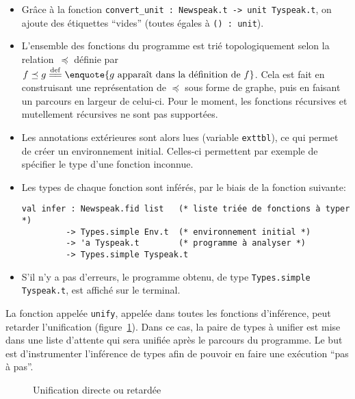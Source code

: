\begin{itemize}

\item Grâce à la fonction \verb!convert_unit : Newspeak.t -> unit Tyspeak.t!, on
ajoute des étiquettes \enquote{vides} (toutes égales à \verb!() : unit!).

\item L'ensemble des fonctions du programme est trié topologiquement selon la
    relation~$\preceq$ définie par $f \preceq g \eqdef \enquote{g \textrm{
    apparaît dans la définition de } f}$. Cela est fait en construisant une
    représentation de $\preceq$ sous forme de graphe, puis en faisant un
    parcours en largeur de celui-ci. Pour le moment, les fonctions récursives et
    mutellement récursives ne sont pas supportées.

\item Les annotations extérieures sont alors lues (variable \texttt{exttbl}), ce
  qui permet de créer un environnement initial. Celles-ci permettent par exemple
  de spécifier le type d'une fonction inconnue.

\item Les types de chaque fonction sont inférés, par le biais de la fonction
  suivante:

\begin{Verbatim}
val infer : Newspeak.fid list   (* liste triée de fonctions à typer *)
         -> Types.simple Env.t  (* environnement initial *)
         -> 'a Tyspeak.t        (* programme à analyser *)
         -> Types.simple Tyspeak.t
\end{Verbatim}

\item S'il n'y a pas d'erreurs, le programme obtenu, de type
\texttt{Types.simple Tyspeak.t}, est affiché sur le terminal.

\end{itemize}

La fonction appelée \texttt{unify}, appelée dans toutes les fonctions
d'inférence, peut retarder l'unification (figure~\ref{fig:implem-lazy}). Dans ce
cas, la paire de types à unifier est mise dans une liste d'attente qui sera
unifiée après le parcours du programme. Le but est d'instrumenter l'inférence de
types afin de pouvoir en faire une exécution \enquote{pas à pas}.

\begin{figure}


\caption{Unification directe ou retardée}
\label{fig:implem-lazy}
\end{figure}

